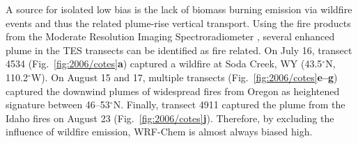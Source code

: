 A source for isolated low bias is the lack of biomass burning emission via wildfire events and thus the related plume-rise vertical transport. Using the fire products from
the Moderate Resolution Imaging Spectroradiometer \citep[MODIS;][]{Justice:2002zr}, several enhanced  plume in the TES transects can be identified as fire
related. On July 16, transect 4534 (Fig.~\ref{fig:2006/cotes}{\bf a}) captured a wildfire at Soda Creek, WY (43.5$^\circ$N, 110.2$^\circ$W). On August 15 and 17, multiple
transects (Fig.~\ref{fig:2006/cotes}{\bf e--g}) captured the downwind plumes of widespread fires from Oregon as heightened  signature between 46--53$^\circ$N.
Finally, transect 4911 captured the plume from the Idaho fires on August 23 (Fig.~\ref{fig:2006/cotes}{\bf j}). Therefore, by excluding the influence of wildfire emission,
WRF-Chem is almost always biased high.

